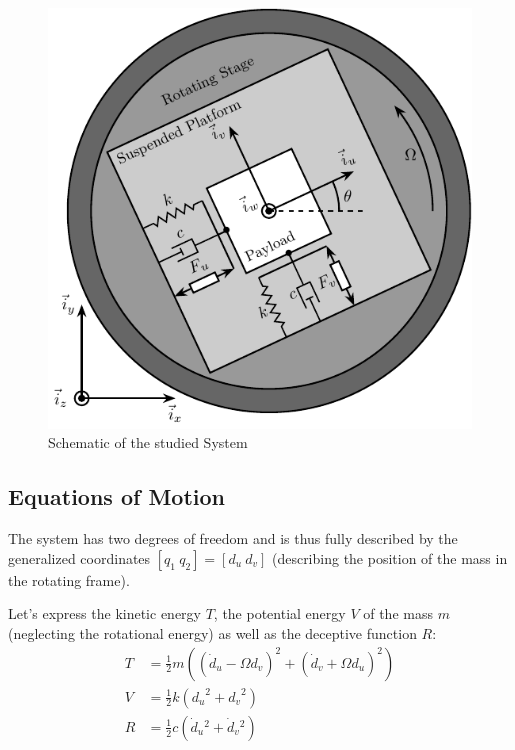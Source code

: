 \documentclass{ISMA_USD2020}
\begin{document}
\begin{figure}[htbp]
\centering
\includegraphics[scale=1]{figs/system.pdf}
\caption{\label{fig:system}Schematic of the studied System}
\end{figure}

\subsection{Equations of Motion}
\label{sec:orgca181a2}
The system has two degrees of freedom and is thus fully described by the generalized coordinates \([q_1\ q_2] = [d_u\ d_v]\) (describing the position of the mass in the rotating frame).

Let's express the kinetic energy \(T\), the potential energy \(V\) of the mass \(m\) (neglecting the rotational energy) as well as the deceptive function \(R\):
\begin{subequations}
\label{eq:energy_functions_lagrange}
  \begin{align}
    T & = \frac{1}{2} m \left( \left( \dot{d}_u - \Omega d_v \right)^2 + \left( \dot{d}_v + \Omega d_u \right)^2 \right) \\
    V & = \frac{1}{2} k \left( {d_u}^2 + {d_v}^2 \right) \\
    R & = \frac{1}{2} c \left( \dot{d}_u{}^2 + \dot{d}_v{}^2 \right)
  \end{align}
\end{subequations}
\end{document}
